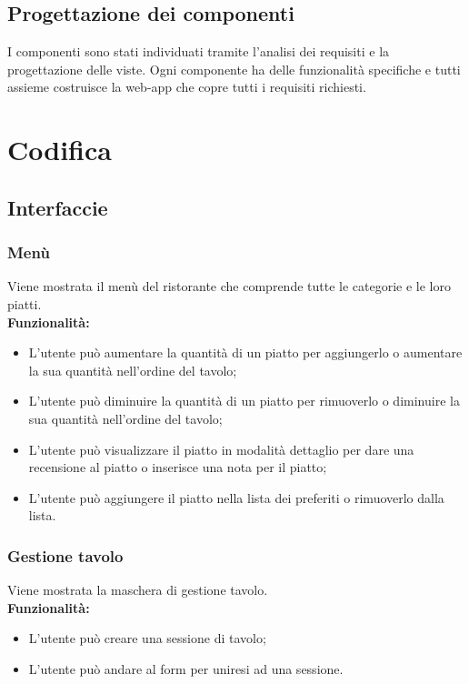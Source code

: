 \subsection{Progettazione dei componenti}
I componenti sono stati individuati tramite l'analisi dei requisiti e la progettazione delle viste. Ogni componente ha delle funzionalità specifiche e tutti assieme costruisce la web-app che copre tutti i requisiti richiesti.
\\
\section{Codifica}
\subsection{Interfaccie}
\subsubsection{Menù}
Viene mostrata il menù del ristorante che comprende tutte le categorie e le loro piatti.\\
\textbf{Funzionalità:}
\begin{itemize}
    \item L'utente può aumentare la quantità di un piatto per aggiungerlo o aumentare la sua quantità nell'ordine del tavolo;
    \item L'utente può diminuire la quantità di un piatto per rimuoverlo o diminuire la sua quantità nell'ordine del tavolo;
    \item L'utente può visualizzare il piatto in modalità dettaglio per dare una recensione al piatto o inserisce una nota per il piatto;
    \item L'utente può aggiungere il piatto nella lista dei preferiti o rimuoverlo dalla lista.
\end{itemize}


\subsubsection{Gestione tavolo}
Viene mostrata la maschera di gestione tavolo.\\
\textbf{Funzionalità:}
\begin{itemize}
    \item L'utente può creare una sessione di tavolo;
    \item L'utente può andare al form per uniresi ad una sessione.
\end{itemize}


